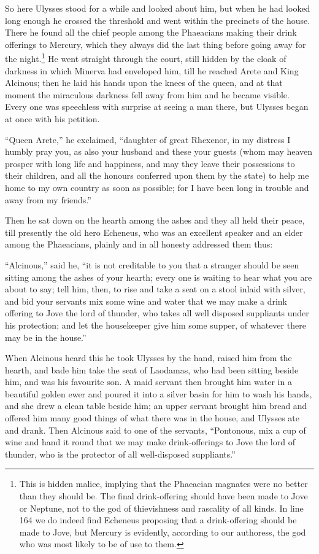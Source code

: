 So here Ulysses stood for a while and looked about him, but when he had looked
long enough he crossed the threshold and went within the precincts of the
house. There he found all the chief people among the Phaeacians making their
drink offerings to Mercury, which they always did the last thing before going
away for the night.\footnote{This is hidden malice, implying that the Phaeacian magnates were no better
than they should be. The final drink-offering should have been made to Jove or
Neptune, not to the god of thievishness and rascality of all kinds. In line
164 we do indeed find Echeneus proposing that a drink-offering should be made
to Jove, but Mercury is evidently, according to our authoress, the god who was
most likely to be of use to them.} He went straight through the court,
still hidden by the cloak of darkness in which Minerva had enveloped him, till
he reached Arete and King Alcinous; then he laid his hands upon the knees of
the queen, and at that moment the miraculous darkness fell away from him and he
became visible. Every one was speechless with surprise at seeing a man there,
but Ulysses began at once with his petition.

“Queen Arete,” he exclaimed, “daughter of great Rhexenor, in my distress I
humbly pray you, as also your husband and these your guests (whom may heaven
prosper with long life and happiness, and may they leave their possessions to
their children, and all the honours conferred upon them by the state) to help
me home to my own country as soon as possible; for I have been long in trouble
and away from my friends.”

Then he sat down on the hearth among the ashes and they all held their peace,
till presently the old hero Echeneus, who was an excellent speaker and an elder
among the Phaeacians, plainly and in all honesty addressed them thus:

“Alcinous,” said he, “it is not creditable to you that a stranger should be
seen sitting among the ashes of your hearth; every one is waiting to hear what
you are about to say; tell him, then, to rise and take a seat on a stool inlaid
with silver, and bid your servants mix some wine and water that we may make a
drink offering to Jove the lord of thunder, who takes all well disposed
suppliants under his protection; and let the housekeeper give him some supper,
of whatever there may be in the house.”

When Alcinous heard this he took Ulysses by the hand, raised him from the
hearth, and bade him take the seat of Laodamas, who had been sitting beside
him, and was his favourite son. A maid servant then brought him water in a
beautiful golden ewer and poured it into a silver basin for him to wash his
hands, and she drew a clean table beside him; an upper servant brought him
bread and offered him many good things of what there was in the house, and
Ulysses ate and drank. Then Alcinous said to one of the servants, “Pontonous,
mix a cup of wine and hand it round that we may make drink-offerings to Jove
the lord of thunder, who is the protector of all well-disposed suppliants.”

